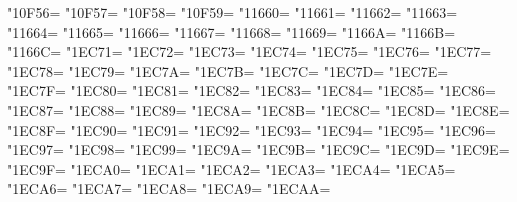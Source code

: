 \XeTeXcharclass"10F56=\KclassArabU
\XeTeXcharclass"10F57=\KclassArabU
\XeTeXcharclass"10F58=\KclassArabU
\XeTeXcharclass"10F59=\KclassArabU
\XeTeXcharclass"11660=\KclassArabU
\XeTeXcharclass"11661=\KclassArabU
\XeTeXcharclass"11662=\KclassArabU
\XeTeXcharclass"11663=\KclassArabU
\XeTeXcharclass"11664=\KclassArabU
\XeTeXcharclass"11665=\KclassArabU
\XeTeXcharclass"11666=\KclassArabU
\XeTeXcharclass"11667=\KclassArabU
\XeTeXcharclass"11668=\KclassArabU
\XeTeXcharclass"11669=\KclassArabU
\XeTeXcharclass"1166A=\KclassArabU
\XeTeXcharclass"1166B=\KclassArabU
\XeTeXcharclass"1166C=\KclassArabU
\XeTeXcharclass"1EC71=\KclassArabU
\XeTeXcharclass"1EC72=\KclassArabU
\XeTeXcharclass"1EC73=\KclassArabU
\XeTeXcharclass"1EC74=\KclassArabU
\XeTeXcharclass"1EC75=\KclassArabU
\XeTeXcharclass"1EC76=\KclassArabU
\XeTeXcharclass"1EC77=\KclassArabU
\XeTeXcharclass"1EC78=\KclassArabU
\XeTeXcharclass"1EC79=\KclassArabU
\XeTeXcharclass"1EC7A=\KclassArabU
\XeTeXcharclass"1EC7B=\KclassArabU
\XeTeXcharclass"1EC7C=\KclassArabU
\XeTeXcharclass"1EC7D=\KclassArabU
\XeTeXcharclass"1EC7E=\KclassArabU
\XeTeXcharclass"1EC7F=\KclassArabU
\XeTeXcharclass"1EC80=\KclassArabU
\XeTeXcharclass"1EC81=\KclassArabU
\XeTeXcharclass"1EC82=\KclassArabU
\XeTeXcharclass"1EC83=\KclassArabU
\XeTeXcharclass"1EC84=\KclassArabU
\XeTeXcharclass"1EC85=\KclassArabU
\XeTeXcharclass"1EC86=\KclassArabU
\XeTeXcharclass"1EC87=\KclassArabU
\XeTeXcharclass"1EC88=\KclassArabU
\XeTeXcharclass"1EC89=\KclassArabU
\XeTeXcharclass"1EC8A=\KclassArabU
\XeTeXcharclass"1EC8B=\KclassArabU
\XeTeXcharclass"1EC8C=\KclassArabU
\XeTeXcharclass"1EC8D=\KclassArabU
\XeTeXcharclass"1EC8E=\KclassArabU
\XeTeXcharclass"1EC8F=\KclassArabU
\XeTeXcharclass"1EC90=\KclassArabU
\XeTeXcharclass"1EC91=\KclassArabU
\XeTeXcharclass"1EC92=\KclassArabU
\XeTeXcharclass"1EC93=\KclassArabU
\XeTeXcharclass"1EC94=\KclassArabU
\XeTeXcharclass"1EC95=\KclassArabU
\XeTeXcharclass"1EC96=\KclassArabU
\XeTeXcharclass"1EC97=\KclassArabU
\XeTeXcharclass"1EC98=\KclassArabU
\XeTeXcharclass"1EC99=\KclassArabU
\XeTeXcharclass"1EC9A=\KclassArabU
\XeTeXcharclass"1EC9B=\KclassArabU
\XeTeXcharclass"1EC9C=\KclassArabU
\XeTeXcharclass"1EC9D=\KclassArabU
\XeTeXcharclass"1EC9E=\KclassArabU
\XeTeXcharclass"1EC9F=\KclassArabU
\XeTeXcharclass"1ECA0=\KclassArabU
\XeTeXcharclass"1ECA1=\KclassArabU
\XeTeXcharclass"1ECA2=\KclassArabU
\XeTeXcharclass"1ECA3=\KclassArabU
\XeTeXcharclass"1ECA4=\KclassArabU
\XeTeXcharclass"1ECA5=\KclassArabU
\XeTeXcharclass"1ECA6=\KclassArabU
\XeTeXcharclass"1ECA7=\KclassArabU
\XeTeXcharclass"1ECA8=\KclassArabU
\XeTeXcharclass"1ECA9=\KclassArabU
\XeTeXcharclass"1ECAA=\KclassArabU
